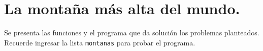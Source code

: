 \section{La montaña más alta del mundo.}

  Se presenta las funciones y el programa que da solución los problemas planteados. Recuerde ingresar la lista \texttt{montanas} para probar el programa.
  
  